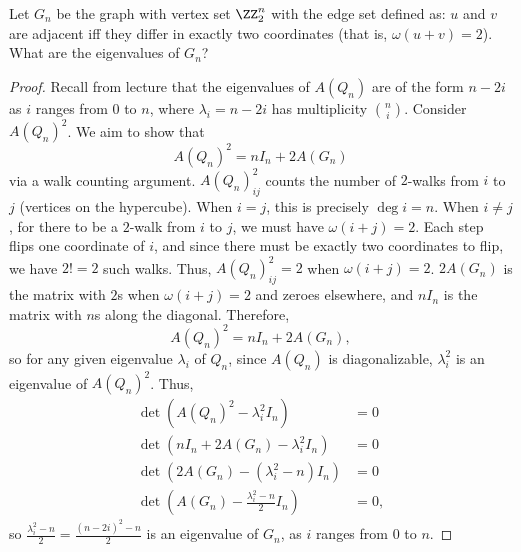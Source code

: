 \documentclass[11pt]{scrartcl}
\begin{document}
\begin{problem}
    Let $G_n$ be the graph with vertex set $\ZZ_2^n$ with the edge set defined as: $u$ and $v$ are adjacent iff they differ in exactly two coordinates (that is, $\omega(u+v)=2$). What are the eigenvalues of $G_n$?
    
\end{problem}
\begin{proof}
    Recall from lecture that the eigenvalues of $A(Q_n)$ are of the form $n-2i$ as $i$ ranges from $0$ to $n$, where $\lambda_i=n-2i$ has multiplicity $\binom{n}{i}$. Consider $A(Q_n)^2$. We aim to show that \[A(Q_n)^2=nI_n+2A(G_n)\] via a walk counting argument. $A(Q_n)^2_{ij}$ counts the number of $2$-walks from $i$ to $j$ (vertices on the hypercube). When $i=j$, this is precisely $\deg i=n$. When $i\neq j$, for there to be a $2$-walk from $i$ to $j$, we must have $\omega(i+j)=2$. Each step flips one coordinate of $i$, and since there must be exactly two coordinates to flip, we have $2!=2$ such walks. Thus, $A(Q_n)^2_{ij}=2$ when $\omega(i+j)=2$. $2A(G_n)$ is the matrix with $2$s when $\omega(i+j)=2$ and zeroes elsewhere, and $nI_n$ is the matrix with $n$s along the diagonal. Therefore, \[A(Q_n)^2=nI_n+2A(G_n),\] so for any given eigenvalue $\lambda_i$ of $Q_n$, since $A(Q_n)$ is diagonalizable, $\lambda_i^2$ is an eigenvalue of $A(Q_n)^2$. Thus,
    \begin{align*}
        \det(A(Q_n)^2-\lambda_i^2I_n)&=0\\
        \det(nI_n+2A(G_n)-\lambda_i^2I_n)&=0\\
        \det(2A(G_n)-(\lambda_i^2-n)I_n)&=0\\
        \det\left(A(G_n)-\frac{\lambda_i^2-n}{2}I_n\right)&=0,
    \end{align*} 
    so $\frac{\lambda_i^2-n}{2}=\frac{(n-2i)^2-n}{2}$ is an eigenvalue of $G_n$, as $i$ ranges from $0$ to $n$.
\end{proof}
\end{document}
